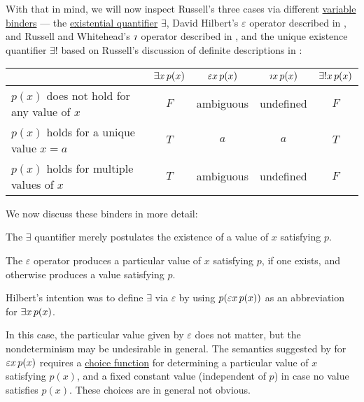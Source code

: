 \begin{concept}
  With that in mind, we will now inspect Russell's three cases via different \hyperref[con:variable_binding]{variable binders} --- the \hyperref[def:predicate_logic_alphabet/quantifiers/existential]{existential quantifier} \( \exists \), David Hilbert's \( \varepsilon \) operator described in \cite{Leisenring1969MathematicalLogic}, and Russell and Whitehead's \( \rotiota \) operator described in \cite[30]{WhiteheadRussell1927PrincipiaMathematicaVol1}, and the unique existence quantifier \( \exists ! \) based on Russell's discussion of definite descriptions in \cite{Russell1905OnDenoting}:
  \begin{center}
    \begin{tabular}{l c c c c}
      \toprule
                                                        & \( \qexists* x p(x) \) & \( \quantifier \varepsilon x p(x) \) & \( \quantifier \rotiota x p(x) \) & \( \qExists* x p(x) \) \\
      \midrule
      \( p(x) \) does not hold for any value of \( x \) & \( F \)                & ambiguous                            & undefined                         & \( F \) \\
      \( p(x) \) holds for a unique value \( x = a \)   & \( T \)                & \( a \)                              & \( a \)                           & \( T \) \\
      \( p(x) \) holds for multiple values of \( x \)   & \( T \)                & ambiguous                            & undefined                         & \( F \) \\
      \bottomrule
    \end{tabular}
  \end{center}

  We now discuss these binders in more detail:
  \begin{thmenum}
     The \( \exists \) quantifier merely postulates the existence of a value of \( x \) satisfying \( p \).

     The \( \varepsilon \) operator produces a particular value of \( x \) satisfying \( p \), if one exists, and otherwise produces a value  satisfying \( p \).

    Hilbert's intention was to define \( \exists \) via \( \varepsilon \) by using \( p(\quantifier \varepsilon x p(x)) \) as an abbreviation for \( \qexists* x p(x) \).

    In this case, the particular value given by \( \varepsilon \) does not matter, but the nondeterminism may be undesirable in general. The semantics suggested by  for \( \quantifier \varepsilon x p(x) \) requires a \hyperref[def:choice_function]{choice function} for determining a particular value of \( x \) satisfying \( p(x) \), and a fixed constant value (independent of \( p \)) in case no value satisfies \( p(x) \). These choices are in general not obvious.


\end{thmenum}
\end{concept}
